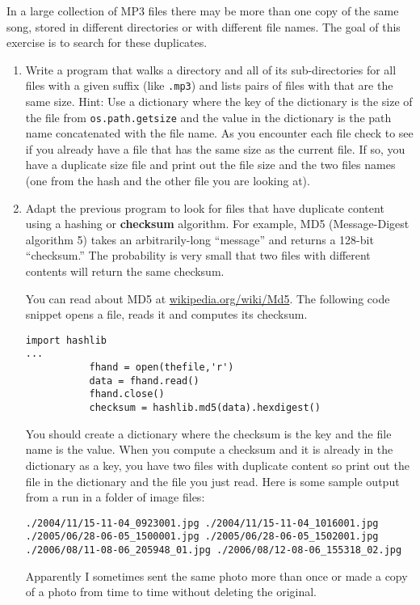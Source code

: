 \begin{ex}
\label{checksum}


In a large collection of MP3 files there may be more than one
copy of the same song, stored in different directories or with
different file names.  The goal of this exercise is to search for
these duplicates.

\begin{enumerate}

\item Write a program that walks a directory and all of its
sub-directories for all files with a given suffix (like {\tt .mp3})
and lists pairs of files with that are the same size.
Hint: Use a dictionary where the key of the dictionary is the size
of the file from {\tt  os.path.getsize} and the value in the 
dictionary is the path name concatenated with the file name.  
As you encounter each file check to see if you already have a
file that has the same size as the current file.  
If so, you have a duplicate
size file and print out the file size and the two files names 
(one from the hash and the other file you are looking at).


\item Adapt the previous program to look for files that 
have duplicate content using a hashing or {\bf checksum}
algorithm.  For example,
MD5 (Message-Digest algorithm 5) takes an arbitrarily-long
``message'' and returns a 128-bit ``checksum.''  The probability
is very small that two files with different contents will
return the same checksum.

You can read about MD5 at \url{wikipedia.org/wiki/Md5}.  The 
following code snippet opens a file, reads it and computes
its checksum.

\beforeverb
\begin{verbatim}
import hashlib 
...
           fhand = open(thefile,'r')
           data = fhand.read()
           fhand.close()
           checksum = hashlib.md5(data).hexdigest()
\end{verbatim}
\afterverb
%
You should create a dictionary where the checksum is the key 
and the file name is the value.   When you compute a checksum
and it is already in the dictionary as a key, you have two files with 
duplicate content so print out the file in the dictionary
and the file you just read.  Here is some sample output
from a run in a folder of image files:

\beforeverb
\begin{verbatim}
./2004/11/15-11-04_0923001.jpg ./2004/11/15-11-04_1016001.jpg
./2005/06/28-06-05_1500001.jpg ./2005/06/28-06-05_1502001.jpg
./2006/08/11-08-06_205948_01.jpg ./2006/08/12-08-06_155318_02.jpg
\end{verbatim}
\afterverb
%
Apparently I sometimes sent the same photo more than once 
or made a copy of a photo from time to time without deleting
the original.

\end{enumerate}

\end{ex}

